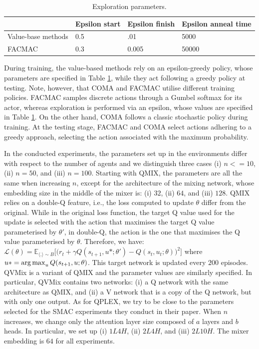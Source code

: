 \begin{table}
    \caption{Exploration parameters.}
    \centering
    \begin{tabular}{llll}
    \toprule
    & Epsilon start & Epsilon finish & Epsilon anneal time \\
    \midrule
    Value-base methods & 0.5  & .01 & 5000\\
    FACMAC & 0.3 & 0.005 & 50000 \\
    \bottomrule
    \end{tabular}
    \label{tab:exloration_param}
\end{table}

During training, the value-based methods rely on an epsilon-greedy policy, whose parameters are specified in Table \ref{tab:exloration_param}, while they act following a greedy policy at testing.
Note, however, that COMA and FACMAC utilise different training policies.
FACMAC samples discrete actions through a Gumbel softmax for its actor, whereas exploration is performed via an epsilon, whose values are specified in Table \ref{tab:exloration_param}.
On the other hand, COMA follows a classic stochastic policy during training.
At the testing stage, FACMAC and COMA select actions adhering to a greedy approach, selecting the action associated with the maximum probability.

In the conducted experiments, the parameters set up in the environments differ with respect to the number of agents and we distinguish three cases (i) $n<=10$, (ii) $n=50$, and (iii) $n=100$.
Starting with QMIX, the parameters are all the same when increasing $n$, except for the architecture of the mixing network, whose embedding size in the middle of the mixer is: (i) $32$, (ii) $64$, and (iii) $128$.
QMIX relies on a double-Q feature, i.e., the loss computed to update $\theta$ differ from the original.
While in the original loss function, the target Q value used for the update is selected with the action that maximises the target Q value parameterised by $\theta'$, in double-Q, the action is the one that maximises the Q value parameterised by $\theta$.
Therefore, we have: $\mathcal{L}(\theta) = \mathbb{E}_{\langle . \rangle\sim B} \big[\big(r_{t} + \gamma Q(s_{t+1}, u*; \theta')- Q(s_{t}, u_{t}; \theta)\big)^{2}\big]$ where $u*=\operatorname*{arg\,max}_u Q(s_{t+1}, u; \theta)$.
This target network is updated every $200$ episodes.
QVMix is a variant of QMIX and the parameter values are similarly specified.
In particular, QVMix contains two networks: (i) a Q network with the same architecture as QMIX, and (ii) a V network that is a copy of the Q network, but with only one output.
As for QPLEX, we try to be close to the parameters selected for the SMAC experiments they conduct in their paper.
When $n$ increases, we change only the attention layer size composed of $a$ layers and $b$ heads.
In particular, we set up (i) $1L4H$, (ii) $2L4H$, and (iii) $2L10H$.
The mixer embedding is $64$ for all experiments.

